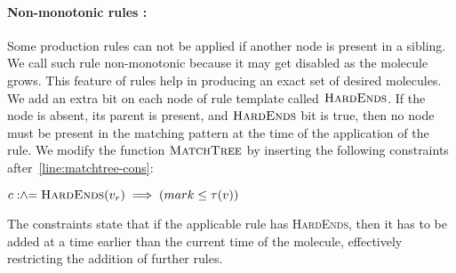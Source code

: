 \paragraph{Non-monotonic rules :}
Some production rules can not be applied if another node is present in a sibling.
We call such rule non-monotonic because it may get disabled as the molecule grows.
This feature of rules help in producing an exact set of desired molecules.
We add an extra bit on each node of rule
template called $\textsc{HardEnds}$.
If the node is absent, its parent is present, and  $\textsc{HardEnds}$ bit is true, then
no node must be present in the matching pattern at the time of the application of the rule.
We modify the function $\textsc{MatchTree}$ by inserting the following constraints after~\ref{line:matchtree-cons}:
\begin{minipage}{1.0\linewidth}
\begin{algorithmic}[1]
  \vspace{1ex}
  \State $c \mathrel{:\hspace{-3pt}\land\hspace{-3pt}=} \textsc{HardEnds}(v_r) \implies (mark \leq \tau(v))$
\end{algorithmic}  
\end{minipage}
The constraints state that if the applicable rule has \textsc{HardEnds}, then it has to be added at a time earlier than the current time of the molecule, effectively restricting the addition of further rules.



